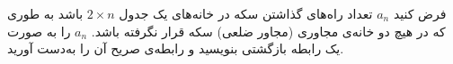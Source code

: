 \EXERCISE
فرض کنید
$a_n$
تعداد راه‌های گذاشتن سکه در خانه‌های یک جدول
$2 \times n$
باشد به طوری که در هیچ دو خانه‌ی مجاوری (مجاور ضلعی) سکه قرار نگرفته باشد.
$a_n$
را به صورت یک رابطه بازگشتی بنویسید و رابطه‌ی صریح آن را به‌دست آورید.
